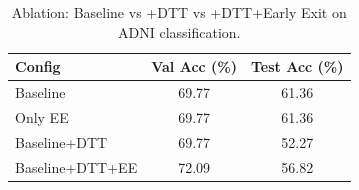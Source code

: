 \begin{table}[htbp]
\centering
\caption{Ablation: Baseline vs +DTT vs +DTT+Early Exit on ADNI classification.}
\label{tab:ablation}
\begin{tabular}{lcc}
\hline
Config & Val Acc (\%) & Test Acc (\%)\\
\hline
Baseline & 69.77 & 61.36 \\
Only EE & 69.77 & 61.36 \\
Baseline+DTT & 69.77 & 52.27 \\
Baseline+DTT+EE & 72.09 & 56.82 \\
\hline
\end{tabular}
\end{table}
